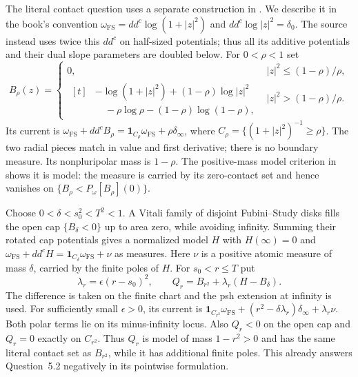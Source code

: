 The literal contact question uses a separate construction in
\cite[Proposition~5.1 and Theorem~5.2]{Xiao26NonuniquenessV1}.
We describe it in the book's convention
$\omega_{\mathrm{FS}}=dd^c\log(1+|z|^2)$ and
$dd^c\log|z|^2=\delta_0$.
The source instead uses twice this $dd^c$ on half-sized
potentials; thus all its additive potentials and their dual
slope parameters are doubled below.
For $0<\rho<1$ set
\[
\tag{65.63}\label{eq:rf-survey-cap}
 B_\rho(z)=
 \begin{cases}
 0,& |z|^2\leq(1-\rho)/\rho,\\
 \begin{aligned}[t]
 &-\log(1+|z|^2)+(1-\rho)\log|z|^2\\
 &\quad-\rho\log\rho-(1-\rho)\log(1-\rho),
 \end{aligned}
       & |z|^2>(1-\rho)/\rho.
 \end{cases}
\]
Its current is
$\omega_{\mathrm{FS}}+dd^cB_\rho
 =\mathbf1_{C_\rho}\omega_{\mathrm{FS}}+\rho\delta_\infty$,
where $C_\rho=\{(1+|z|^2)^{-1}\geq\rho\}$.
The two radial pieces match in value and first derivative;
there is no boundary measure. Its nonpluripolar mass is
$1-\rho$. The positive-mass model criterion in
\cite[Corollary~3.4(iv)]{DNT19ContactV1} shows it is model:
the measure is carried by its zero-contact set and hence
vanishes on $\{B_\rho<P_\omega[B_\rho](0)\}$.

Choose $0<\delta<s_0^2<T^2<1$. A Vitali family of disjoint
Fubini--Study disks fills the open cap $\{B_\delta<0\}$
up to area zero, while avoiding infinity. Summing their
rotated cap potentials gives a normalized model $H$ with
$H(\infty)=0$ and
$\omega_{\mathrm{FS}}+dd^cH
 =\mathbf1_{C_\delta}\omega_{\mathrm{FS}}+\nu$ as measures.
Here $\nu$ is a positive atomic measure of mass $\delta$,
carried by the finite poles of $H$. For $s_0<r\leq T$ put
\[
\tag{65.64}\label{eq:rf-survey-perturbed-cap}
 \lambda_r=\epsilon(r-s_0)^2,\qquad
 Q_r=B_{r^2}+\lambda_r(H-B_\delta).
\]
The difference is taken on the finite chart and the psh
extension at infinity is used. For sufficiently small
$\epsilon>0$, its current is
$\mathbf1_{C_{r^2}}\omega_{\mathrm{FS}}
 +(r^2-\delta\lambda_r)\delta_\infty+\lambda_r\nu$.
Both polar terms lie on its minus-infinity locus. Also
$Q_r<0$ on the open cap and $Q_r=0$ exactly on $C_{r^2}$.
Thus $Q_r$ is model of mass $1-r^2>0$ and has the same
literal contact set as $B_{r^2}$, while it has additional
finite poles. This already answers Question~5.2 negatively
in its pointwise formulation.

